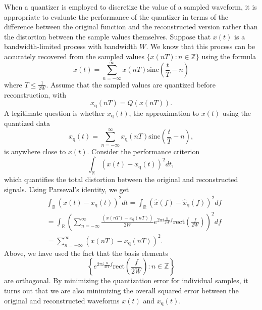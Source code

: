 When a quantizer is employed to discretize the value of a sampled waveform, it is appropriate to evaluate the performance of the quantizer in terms of the difference between the original function and the reconstructed version rather than the distortion between the sample values themselves.
Suppose that $x(t)$ is a bandwidth-limited process with bandwidth $W$.
We know that this process can be accurately recovered from the sampled values $\{ x(nT) : n \in \mathbb{Z} \}$ using the formula
\begin{equation*}
x(t) = \sum_{n = -\infty}^{\infty} x(nT) \mathrm{sinc} \left( \frac{t}{T} - n \right)
\end{equation*}
where $T \leq \frac{1}{2W}$.
Assume that the sampled values are quantized before reconstruction, with
\begin{equation*}
x_{\mathrm{q}} (nT) = Q ( x(nT) ) .
\end{equation*}
A legitimate question is whether $x_{\mathrm{q}}(t)$, the approximation to $x(t)$ using the quantized data
\begin{equation*}
x_{\mathrm{q}}(t) = \sum_{n = -\infty}^{\infty} x_{\mathrm{q}}(nT) \mathrm{sinc} \left( \frac{t}{T} - n \right) ,
\end{equation*}
is anywhere close to $x(t)$.
Consider the performance criterion
\begin{equation*}
\int_{\mathbb{R}} ( x(t) - x_{\mathrm{q}} (t) )^2 dt ,
\end{equation*}
which quantifies the total distortion between the original and reconstructed signals.
Using Parseval's identity, we get
\begin{equation*}
\begin{split}
&\int_{\mathbb{R}} ( x(t) - x_{\mathrm{q}} (t) )^2 dt
= \int_{\mathbb{R}} ( \hat{x} (f) - \hat{x}_{\mathrm{q}} (f) )^2 df \\
&= \int_{\mathbb{R}} \left( \sum_{n = -\infty}^{\infty}
\frac{\left( x(nT) - x_{\mathrm{q}}(nT) \right)}{2W} e^{2 \pi i \frac{n}{2 W} f}
\mathrm{rect} \left( \frac{f}{2W} \right) \right)^2 df \\
&= \sum_{n = -\infty}^{\infty}
( x(nT) - x_{\mathrm{q}}(nT) )^2 .
\end{split}
\end{equation*}
Above, we have used the fact that the basis elements
\begin{equation*}
\left\{ e^{2 \pi i \frac{n}{2 W} f} \mathrm{rect} \left( \frac{f}{2W} \right) : n \in \mathbb{Z} \right\}
\end{equation*}
are orthogonal.
By minimizing the quantization error for individual samples, it turns out that we are also minimizing the overall squared error between the original and reconstructed waveforms $x(t)$ and $x_{\mathrm{q}}(t)$.


